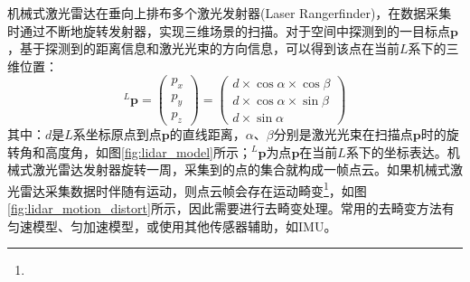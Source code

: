 机械式激光雷达在垂向上排布多个激光发射器(Laser Rangerfinder)，在数据采集时通过不断地旋转发射器，实现三维场景的扫描。对于空间中探测到的一目标点$\boldsymbol{p}$，基于探测到的距离信息和激光光束的方向信息，可以得到该点在当前$L$系下的三维位置：
\begin{equation}
  \label{equ:lidar_model}
  {^{L}\boldsymbol{p}}=\begin{pmatrix}
    p_x \\
    p_y \\
    p_z
  \end{pmatrix}=\begin{pmatrix}
    d\times\cos\alpha\times\cos\beta \\
    d\times\cos\alpha\times\sin\beta \\
    d\times\sin\alpha
  \end{pmatrix}
\end{equation}
其中：$d$是$L$系坐标原点到点$\boldsymbol{p}$的直线距离，$\alpha$、$\beta$分别是激光光束在扫描点$\boldsymbol{p}$时的旋转角和高度角，如图\ref{fig:lidar_model}所示；${^{L}\boldsymbol{p}}$为点$\boldsymbol{p}$在当前$L$系下的坐标表达。机械式激光雷达发射器旋转一周，采集到的点的集合就构成一帧点云。如果机械式激光雷达采集数据时伴随有运动，则点云帧会存在运动畸变\footnote{}，如图\ref{fig:lidar_motion_distort}所示，因此需要进行去畸变处理。常用的去畸变方法有匀速模型、匀加速模型，或使用其他传感器辅助，如IMU。

